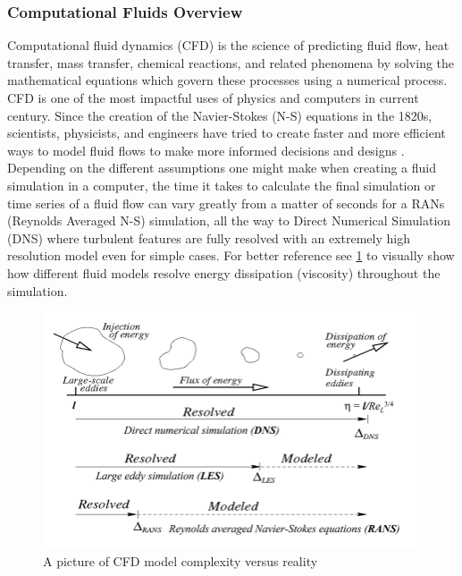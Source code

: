 \documentclass{article}
\begin{document}
\subsubsection{Computational Fluids Overview}

Computational fluid dynamics (CFD) is the science of predicting fluid
flow, heat transfer, mass transfer, chemical reactions, and
related phenomena by solving the mathematical equations which govern
these processes using a numerical process.\cite{Bakker}
CFD is one of the most impactful uses of physics and computers in
current century. Since the creation of the Navier-Stokes (N-S) equations in the
1820s, scientists, physicists, and engineers have tried to create faster and
more efficient ways to model fluid flows to make more informed decisions and
designs \cite{Bakker}. Depending on the different assumptions one might make
when creating a fluid simulation in a computer, the time it takes to calculate
the final simulation or time series of a fluid flow can vary greatly from a
matter of seconds for a RANs (Reynolds Averaged N-S) simulation, all the way to
Direct Numerical Simulation (DNS) where turbulent features are fully resolved
with an extremely high resolution model even for simple cases. For better
reference see \ref{fig:complex} to visually show how different fluid models
resolve energy dissipation (viscosity) throughout the simulation.


\begin{figure}[ht!]
	\centering
	\includegraphics[scale=0.4]{./images/complex.png}
	\caption{A picture of CFD model complexity versus reality}
	\label{fig:complex}
\end{figure}
\end{document}
